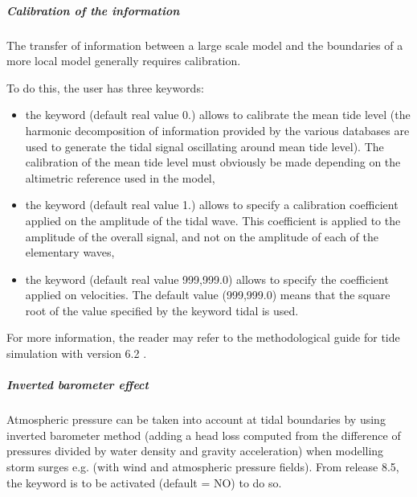 \subparagraph{Calibration of the information}

The transfer of information between a large scale model and the boundaries of
a more local model generally requires calibration.

To do this, the user has three keywords:

\begin{itemize}
\item the keyword  (default real
value 0.) allows to calibrate the mean tide level (the harmonic decomposition
of information provided by the various databases are used to generate the tidal
signal oscillating around mean tide level).
The calibration of the mean tide level must obviously be made depending on the
altimetric reference used in the model,

\item the keyword  (default real
value 1.) allows to specify a calibration coefficient applied on the amplitude
of the tidal wave.
This coefficient is applied to the amplitude of the overall signal, and not on
the amplitude of each of the elementary waves,

\item the keyword 
(default real value 999,999.0) allows to specify the coefficient applied on
velocities.
The default value (999,999.0) means that the square root of the value specified
by the keyword  tidal is used.
\end{itemize}

For more information, the reader may refer to the methodological guide
for tide simulation with version 6.2 \cite{Pham2012}.

\subparagraph{Inverted barometer effect}

Atmospheric pressure can be taken into account at tidal boundaries by using
inverted barometer method (adding a head loss computed from the difference of
pressures divided by water density and gravity acceleration)
when modelling storm surges e.g. (with wind and atmospheric pressure fields).
From release 8.5, the keyword 
is to be activated (default = NO) to do so.
